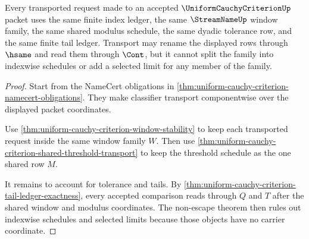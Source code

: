 \begin{theorem}
\label{thm:uniform-cauchy-criterion-finite-family-window-exhaustion}
Every transported request made to an accepted $\UniformCauchyCriterionUp$
packet uses the same finite index ledger, the same $\StreamNameUp$ window
family, the same shared modulus schedule, the same dyadic tolerance row, and
the same finite tail ledger. Transport may rename the displayed rows through
$\hsame$ and read them through $\Cont$, but it cannot split the family into
indexwise schedules or add a selected limit for any member of the family.
\end{theorem}
\begin{proof}
Start from the NameCert obligations in
\autoref{thm:uniform-cauchy-criterion-namecert-obligations}. They make
classifier transport componentwise over the displayed packet coordinates.

Use \autoref{thm:uniform-cauchy-criterion-window-stability} to keep each
transported request inside the same window family $W$. Then use
\autoref{thm:uniform-cauchy-criterion-shared-threshold-transport} to keep the
threshold schedule as the one shared row $M$.

It remains to account for tolerance and tails. By
\autoref{thm:uniform-cauchy-criterion-tail-ledger-exactness}, every accepted
comparison reads through $Q$ and $T$ after the shared window and modulus
coordinates. The non-escape theorem then rules out indexwise schedules and
selected limits because those objects have no carrier coordinate.
\end{proof}

